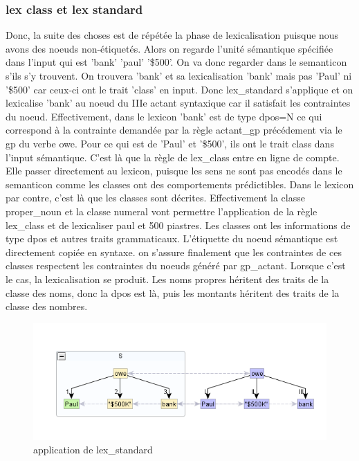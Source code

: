 \subsubsection{lex class et lex standard}
Donc, la suite des choses est de répétée la phase de lexicalisation puisque nous avons des noeuds non-étiquetés. Alors on regarde l'unité sémantique spécifiée dans l'input qui est 'bank' 'paul' '\$500'. On va donc regarder dans le semanticon s'ils s'y trouvent. On trouvera 'bank' et sa lexicalisation 'bank' mais pas 'Paul' ni '\$500' car ceux-ci ont le trait 'class' en input. Donc lex\_standard s'applique et on lexicalise 'bank' au noeud du IIIe actant syntaxique car il satisfait les contraintes du noeud. Effectivement, dans le lexicon 'bank' est de type dpos=N ce qui correspond à la contrainte demandée par la règle actant\_gp précédement via le gp du verbe owe. Pour ce qui est de 'Paul' et '\$500', ils ont le trait class dans l'input sémantique. C'est là que la règle de lex\_class entre en ligne de compte. Elle passer directement au lexicon, puisque les sens ne sont pas encodés dans le semanticon comme les classes ont des comportements prédictibles. Dans le lexicon par contre, c'est là que les classes sont décrites. Effectivement la classe proper\_noun et la classe numeral vont permettre l'application de la règle lex\_class et de lexicaliser paul et 500 piastres. Les classes ont les informations de type dpos et autres traits grammaticaux. L'étiquette du noeud sémantique est directement copiée en syntaxe. on s'assure finalement que les contraintes de ces classes respectent les contraintes du noeuds généré par gp\_actant. Lorsque c'est le cas, la lexicalisation se produit. Les noms propres héritent des traits de la classe des noms, donc la dpos est là, puis les montants héritent des traits de la classe des nombres.

\begin{figure}[htb]
	\centering
	\includegraphics[width=1\textwidth, trim = {0cm 0cm 0cm 0cm},clip]{ch3/figs/lex_standard2.png}
	\caption{application de lex\_standard}
	\label{fig:lexstand2}
\end{figure}


